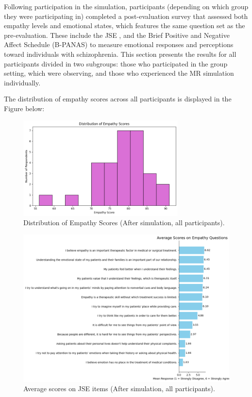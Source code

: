 Following participation in the simulation, participants (depending on which group they were participating in) completed a post-evaluation survey that assessed both empathy levels and emotional states, which features the same question set as the pre-evaluation. These include the JSE \cite{Hojat2002}, and the Brief Positive and Negative Affect Schedule (B-PANAS) \cite{Boiroux2024} to measure emotional responses and perceptions toward individuals with schizophrenia. This section presents the results for all participants divided in two subgroups: those who participated in the group setting, which were observing, and those who experienced the MR simulation individually.

\vspace{1em}

The distribution of empathy scores across all participants is displayed in the Figure below:

\begin{figure}[htbp]
\centering
\includegraphics[width=0.75\textwidth]{../../Figures/empathy_scores_post_all.png}
\caption{Distribution of Empathy Scores (After simulation, all participants).}
\label{fig:empathy_scores_post_all}
\end{figure}

\vspace{1em}

\begin{figure}[htbp]
\centering
\includegraphics[width=\columnwidth]{../../Figures/avg_scores_post_all.png}
\caption{Average scores on JSE items (After simulation, all participants).}
\label{fig:avg_scores_post_all}
\end{figure}

